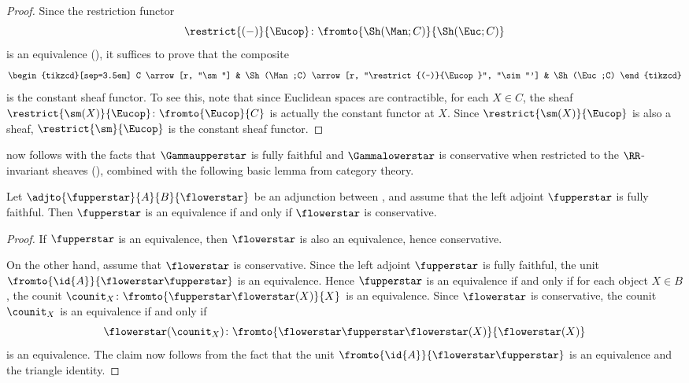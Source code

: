 \begin{proof}
	Since the restriction functor
	\begin{equation*}
		\restrict{(-)}{\Eucop} \colon \fromto{\Sh(\Man;C)}{\Sh(\Euc;C)}
	\end{equation*}
	is an equivalence (), it suffices to prove that the composite
	\begin{equation}
		\begin{tikzcd}[sep=3.5em]
			C \arrow[r, "\sm"] & \Sh(\Man;C) \arrow[r, "\restrict{(-)}{\Eucop}", "\sim"'] & \Sh(\Euc;C)
		\end{tikzcd}
	\end{equation}
	is the constant sheaf functor.
	To see this, note that since Euclidean spaces are contractible, for each $ X \in C $, the sheaf $ \restrict{\sm(X)}{\Eucop} \colon \fromto{\Eucop}{C} $ is actually the constant functor at $ X $.
	Since $ \restrict{\sm(X)}{\Eucop} $ is also a sheaf, $ \restrict{\sm}{\Eucop} $ is the constant sheaf functor.
\end{proof}

 now follows with the facts that $ \Gammaupperstar $ is fully faithful and $ \Gammalowerstar $ is conservative when restricted to the $ \RR $-invariant sheaves (), combined with the following basic lemma from category theory.

\begin{lemma}\label{lem:conservativeradjffladj}
	Let $ \adjto{\fupperstar}{A}{B}{\flowerstar} $ be an adjunction between \categories, and assume that the left adjoint $ \fupperstar $ is fully faithful.
	Then $ \fupperstar $ is an equivalence if and only if $ \flowerstar $ is conservative.
\end{lemma}

\begin{proof}
	If $ \fupperstar $ is an equivalence, then $ \flowerstar $ is also an equivalence, hence conservative.

	On the other hand, assume that $ \flowerstar $ is conservative. 
	Since the left adjoint $ \fupperstar $ is fully faithful, the unit $ \fromto{\id{A}}{\flowerstar\fupperstar} $ is an equivalence.
	Hence $ \fupperstar $ is an equivalence if and only if for each object $ X \in B $, the counit $ \counit_{X} \colon \fromto{\fupperstar\flowerstar(X)}{X} $ is an equivalence.
	Since $ \flowerstar $ is conservative, the counit $ \counit_{X} $ is an equivalence if and only if
	\begin{equation*}
		\flowerstar(\counit_{X}) \colon \fromto{\flowerstar\fupperstar\flowerstar(X)}{\flowerstar(X)}
	\end{equation*}
	is an equivalence.
	The claim now follows from the fact that the unit $ \fromto{\id{A}}{\flowerstar\fupperstar} $ is an equivalence and the triangle identity.
\end{proof}

